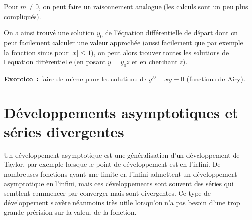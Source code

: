 \documentclass[a4paper,11pt]{book}
\begin{document}
\begin{giacjshere}
Pour $m \neq 0$, on peut faire un raisonnement analogue (les
calculs sont un peu plus compliqu\'es).

On a ainsi trouv\'e une solution $y_0$ de l'\'equation
diff\'erentielle de d\'epart dont on peut facilement calculer
une valeur approch\'ee (aussi facilement que par exemple la fonction sinus
pour $|x| \leq 1$), 
on peut alors trouver toutes les solutions de l'\'equation
diff\'erentielle (en posant $y=y_0 z$ et en cherchant $z$).

{\bf Exercice~:} faire de m\^eme pour les solutions de
$y'{'}-xy=0$ (fonctions de Airy).

\section{Développements asymptotiques et séries
  divergentes}
Un développement asymptotique est une généralisation d'un développement de Taylor, par exemple
lorsque le point de développement est en l'infini. De nombreuses fonctions ayant
une limite en l'infini admettent un développement asymptotique en l'infini, mais ces
développements sont souvent des séries qui semblent commencer par converger
mais sont divergentes. Ce type de développement s'avère néanmoins très utile lorsqu'on
n'a pas besoin d'une trop grande précision sur la valeur de la fonction.


\end{giacjshere}
\end{document}
